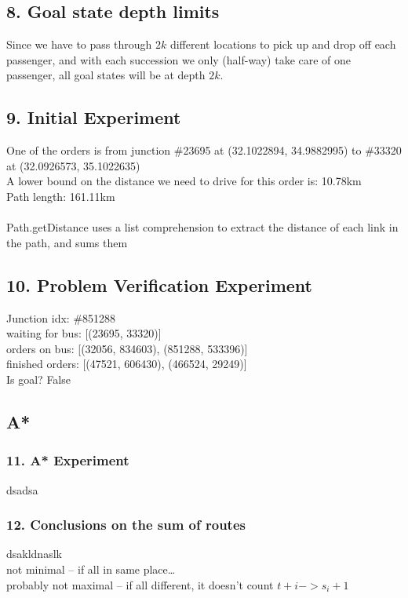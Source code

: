\documentclass{article}
\begin{document}
\subsection*{8. Goal state depth limits}
Since we have to pass through $2k$ different locations to pick up and drop off each passenger, and with each succession we only (half-way) take care of one passenger, all goal states will be at depth $2k$.

\subsection*{9. Initial Experiment}
One of the orders is from junction \#23695 at (32.1022894, 34.9882995) to \#33320 at (32.0926573, 35.1022635) \\ 
A lower bound on the distance we need to drive for this order is: 10.78km \\ 
Path length: 161.11km \\ 
\\ 
Path.getDistance uses a list comprehension to extract the distance of each link in the path, and sums them

\subsection*{10. Problem Verification Experiment}
Junction idx: \#851288 \\ 
waiting for bus: [(23695, 33320)] \\ 
orders on bus: [(32056, 834603), (851288, 533396)] \\ 
finished orders: [(47521, 606430), (466524, 29249)] \\
Is goal? False

\subsection*{A*}
\subsubsection*{11. A* Experiment}
dsadsa

\subsubsection*{12. Conclusions on the sum of routes}
dsakldnaslk \\ 

not minimal – if all in same place…  \\
probably not maximal – if all different, it doesn’t count $t+i->s_i+1$ \\
\end{document}
